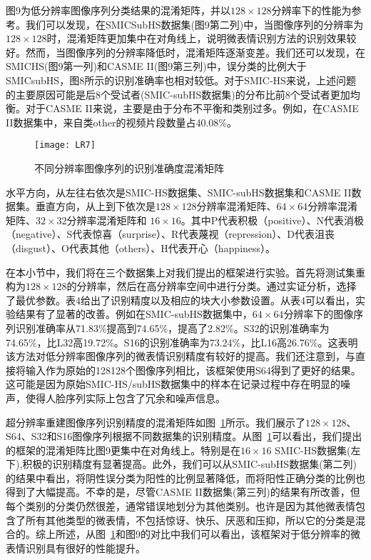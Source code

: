 图9为低分辨率图像序列分类结果的混淆矩阵，并以$ 128 \times 128 $分辨率下的性能为参考。我们可以发现，在SMICSubHS数据集(图9第二列)中，当图像序列的分辨率为$ 128 \times 128 $时，混淆矩阵更加集中在对角线上，说明微表情识别方法的识别效果较好。然而，当图像序列的分辨率降低时，混淆矩阵逐渐变差。我们还可以发现，在SMICHS(图9第一列)和CASME II(图9第三列)中，误分类的比例大于SMICsubHS，图8所示的识别准确率也相对较低。对于SMIC-HS来说，上述问题的主要原因可能是后8个受试者(SMIC-subHS数据集)的分布比前8个受试者更加均衡。对于CASME II来说，主要是由于分布不平衡和类别过多。例如，在CASME II数据集中，来自类other的视频片段数量占40.08\%。

\begin{figure}[!htb]
\centering
\texttt{[image: LR7]}
\caption{不同分辨率图像序列的识别准确度混淆矩阵}
\label{fig17}
\end{figure}

水平方向，从左往右依次是SMIC-HS数据集、SMIC-subHS数据集和CASME II数据集。垂直方向，从上到下依次是$ 128 \times 128 $分辨率混淆矩阵、$ 64 \times 64 $分辨率混淆矩阵、$ 32 \times 32 $分辨率混淆矩阵和 $ 16 \times 16 $。其中P代表积极（positive）、N代表消极（negative）、S代表惊喜（surprise）、R代表蔑视（repression）、D代表沮丧（disgust）、O代表其他（others）、H代表开心（happiness）。

在本小节中，我们将在三个数据集上对我们提出的框架进行实验。首先将测试集重构为$ 128 \times 128 $的分辨率，然后在高分辨率空间中进行分类。通过实证分析，选择了最优参数。表4给出了识别精度以及相应的块大小参数设置。从表4可以看出，实验结果有了显著的改善。例如在SMIC-subHS数据集中，$ 64 \times 64 $分辨率下的图像序列识别准确率从71.83\%提高到74.65\%，提高了2.82\%。S32的识别准确率为74.65\%，比L32高19.72\%。S16的识别准确率为73.24\%，比L16高26.76\%。这表明该方法对低分辨率图像序列的微表情识别精度有较好的提高。我们还注意到，与直接将输入作为原始的128128个图像序列相比，该框架使用S64得到了更好的结果。这可能是因为原始SMIC-HS/subHS数据集中的样本在记录过程中存在明显的噪声，使得人脸序列实际上包含了冗余和噪声信息。

超分辨率重建图像序列识别精度的混淆矩阵如图~\ref{fig17}所示。我们展示了$ 128 \times 128 $、S64、S32和S16图像序列根据不同数据集的识别精度。从图~\ref{fig17}可以看出，我们提出的框架的混淆矩阵比图9更集中在对角线上。特别是在$ 16 \times 16 $ SMIC-HS数据集(左下),积极的识别精度有显著提高。此外，我们可以从SMIC-subHS数据集(第二列)的结果中看出，将阴性误分类为阳性的比例显著降低，而将阳性正确分类的比例也得到了大幅提高。不幸的是，尽管CASME II数据集(第三列)的结果有所改善，但每个类别的分类仍然很差，通常错误地划分为其他类别。也许是因为其他微表情包含了所有其他类型的微表情，不包括惊讶、快乐、厌恶和压抑，所以它的分类是混合的。综上所述，从图~\ref{fig17}和图9的对比中我们可以看出，该框架对于低分辨率的微表情识别具有很好的性能提升。


